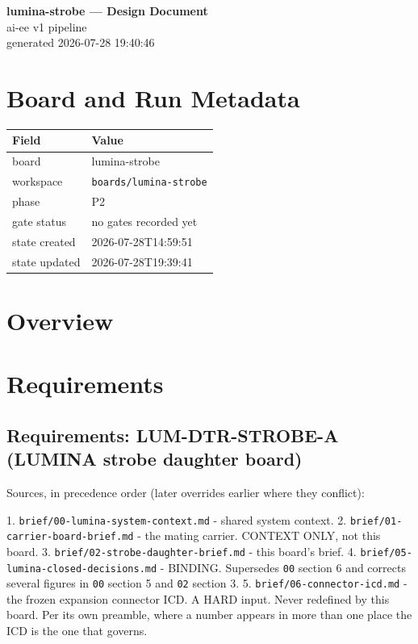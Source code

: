 \documentclass[11pt,a4paper]{article}
\begin{document}
\sloppy
\begin{center}
{\LARGE\bfseries lumina-strobe --- Design Document}\\[6pt]
{\large ai-ee v1 pipeline}\\[2pt]
generated 2026-07-28 19:40:46
\end{center}
\tableofcontents

\section{Board and Run Metadata}
{\small
\begin{longtable}{lp{11cm}}
\toprule
\textbf{Field} & \textbf{Value} \\
\midrule
\endhead
board & lumina-strobe \\
workspace & \texttt{boards/lumina-strobe} \\
phase & P2 \\
gate status & no gates recorded yet \\
state created & 2026-07-28T14:59:51 \\
state updated & 2026-07-28T19:39:41 \\
\bottomrule
\end{longtable}
}
\section{Overview}
\section{Requirements}
\subsection*{Requirements: LUM-DTR-STROBE-A (LUMINA strobe daughter board)}
Sources, in precedence order (later overrides earlier where they conflict):

1. \texttt{brief/00-lumina-system-context.md} - shared system context. 2. \texttt{brief/01-carrier-board-brief.md} - the mating carrier. CONTEXT ONLY, not this board. 3. \texttt{brief/02-strobe-daughter-brief.md} - this board's brief. 4. \texttt{brief/05-lumina-closed-decisions.md} - BINDING. Supersedes \texttt{00} section 6 and corrects several figures in \texttt{00} section 5 and \texttt{02} section 3. 5. \texttt{brief/06-connector-icd.md} - the frozen expansion connector ICD. A HARD input. Never redefined by this board. Per its own preamble, where a number appears in more than one place the ICD is the one that governs.
\end{document}
